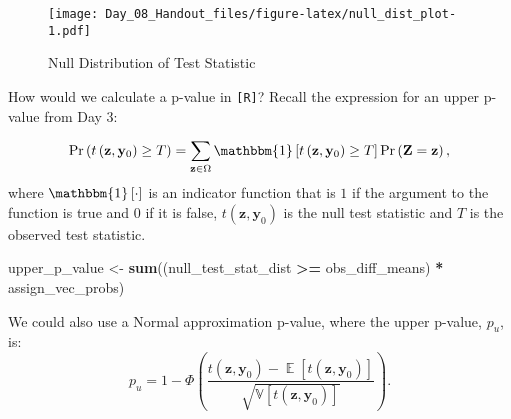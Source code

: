 \documentclass[12pt,leqno]{article}
\makeatletter
\newenvironment{Shaded}{\begin{snugshade}}{\end{snugshade}}
\newcommand{\DataTypeTok}[1]{\textcolor[rgb]{0.13,0.29,0.53}{#1}}
\newcommand{\DecValTok}[1]{\textcolor[rgb]{0.00,0.00,0.81}{#1}}
\newcommand{\KeywordTok}[1]{\textcolor[rgb]{0.13,0.29,0.53}{\textbf{#1}}}
\newcommand{\NormalTok}[1]{#1}
\newcommand{\OperatorTok}[1]{\textcolor[rgb]{0.81,0.36,0.00}{\textbf{#1}}}
\newcommand{\StringTok}[1]{\textcolor[rgb]{0.31,0.60,0.02}{#1}}
\def\maxwidth{\ifdim\Gin@nat@width>\linewidth\linewidth
\else\Gin@nat@width\fi}
\let\Oldincludegraphics\includegraphics
\renewcommand{\includegraphics}[1]{\Oldincludegraphics[width=\maxwidth]{#1}}
\theoremstyle{newstyle}
\DeclareMathOperator{\E}{\mathbb{E}}
\makeatother
\begin{document}
\begin{figure}
\centering
\texttt{[image: Day\_08\_Handout\_files/figure-latex/null\_dist\_plot-1.pdf]}
\caption{Null Distribution of Test Statistic}
\end{figure}

\newpage

How would we calculate a p-value in \texttt{[R]}? Recall the expression
for an upper p-value from Day 3:

\begin{equation}
\Pr\left(t\left(\mathbf{z}, \mathbf{y}_0 \right) \geq T \right) = \sum \limits_{\mathbf{z} \in \Omega} \mathbbm{1}\left[t\left(\mathbf{z}, \mathbf{y}_0 \right) \geq T\right] \Pr\left(\mathbf{Z} = \mathbf{z}\right),
\end{equation} where \(\mathbbm{1}\left[\cdot\right]\) is an indicator
function that is \(1\) if the argument to the function is true and \(0\)
if it is false, \(t\left(\mathbf{z}, \mathbf{y}_0 \right)\) is the null
test statistic and \(T\) is the observed test statistic.

\begin{Shaded}
\begin{Highlighting}[]
\NormalTok{upper\_p\_value \textless{}{-}}\StringTok{ }\KeywordTok{sum}\NormalTok{((null\_test\_stat\_dist }\OperatorTok{\textgreater{}=}\StringTok{ }\NormalTok{obs\_diff\_means) }\OperatorTok{*}\StringTok{ }\NormalTok{assign\_vec\_probs)}
\end{Highlighting}
\end{Shaded}

\newcommand{\V}{\mathbb{V}}

We could also use a Normal approximation p-value, where the upper
p-value, \(p_u\), is: \begin{equation}
p_u =  1 - \Phi\left(\frac{t\left(\mathbf{z}, \mathbf{y}_0 \right) - \E\left[t\left(\mathbf{z}, \mathbf{y}_0 \right)\right]}{\sqrt{\mathbb{V}\left[t\left(\mathbf{z}, \mathbf{y}_0 \right)\right]}}\right).
\end{equation}

\begin{Shaded}
\end{Shaded}
\end{document}
